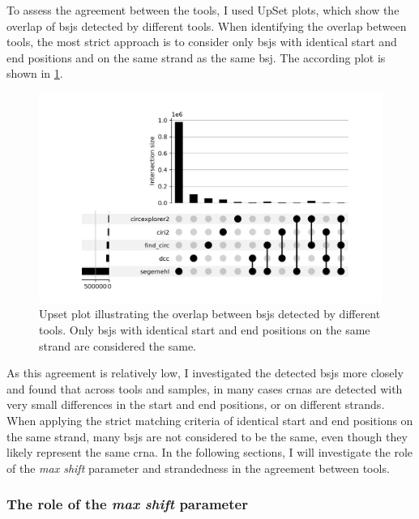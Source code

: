To assess the agreement between the tools, I used UpSet plots, which show the
overlap of \glspl{bsj} detected by different tools.
When identifying the overlap between tools, the most strict approach is to
consider only \glspl{bsj} with identical start and end positions and on the
same strand as the same \gls{bsj}.
The according plot is shown in \cref{fig:detection_upset_0_stranded}.

\begin{figure}[H]
    \centering

    \includegraphics[width=\textwidth]{chapters/4_results_and_discussion/figures/detection/upset/shift_0_stranded.png}
    \caption{Upset plot illustrating the overlap between \glspl{bsj} detected
        by different tools.
        Only \glspl{bsj} with identical start and end positions on the same strand are
        considered the same.
    } \label{fig:detection_upset_0_stranded} \end{figure}

As this agreement is relatively low, I investigated the detected \glspl{bsj}
more closely and found that across tools and samples, in many cases
\glspl{crna} are detected with very small differences in the start and end
positions, or on different strands.
When applying the strict matching criteria of identical start and end positions
on the same strand, many \glspl{bsj} are not considered to be the same, even
though they likely represent the same \gls{crna}.
In the following sections, I will investigate the role of the \textit{max
    shift} parameter and strandedness in the agreement between tools.

\subsubsection{The role of the \textit{max shift} parameter}

